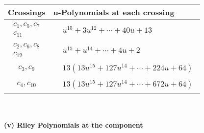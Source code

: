 \documentclass[1p]{elsarticle_modified}
\theoremstyle{definition}
\begin{document}
\begin{tabular}{m{50pt}|m{274pt}}
Crossings & \hspace{64pt}u-Polynomials at each crossing \\
\hline $$\begin{aligned}c_{1},c_{5},c_{7}\\c_{11}\end{aligned}$$&$\begin{aligned}
&u^{15}+3 u^{12}+\cdots+40 u+13
\end{aligned}$\\
\hline $$\begin{aligned}c_{2},c_{6},c_{8}\\c_{12}\end{aligned}$$&$\begin{aligned}
&u^{15}+u^{14}+\cdots+4 u+2
\end{aligned}$\\
\hline $$\begin{aligned}c_{3},c_{9}\end{aligned}$$&$\begin{aligned}
&13(13 u^{15}+127 u^{14}+\cdots+224 u+64)
\end{aligned}$\\
\hline $$\begin{aligned}c_{4},c_{10}\end{aligned}$$&$\begin{aligned}
&13(13 u^{15}+127 u^{14}+\cdots+672 u+64)
\end{aligned}$\\
\hline
\end{tabular}\\~\\
\newpage\renewcommand{\arraystretch}{1}
\flushleft \textbf{(v) Riley Polynomials at the component}\newline \\
\end{document}
